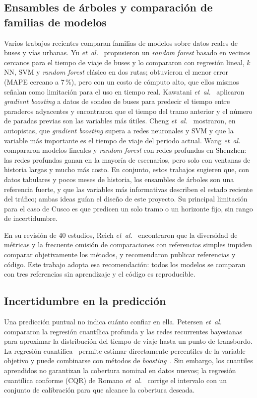 \documentclass[conference,a4paper]{IEEEtran}
\begin{document}
\subsection{Ensambles de árboles y comparación de familias de modelos}
Varios trabajos recientes comparan familias de modelos sobre datos reales de buses y vías urbanas. Yu \emph{et~al.}~\cite{yu2018} propusieron un \emph{random forest} basado en vecinos cercanos para el tiempo de viaje de buses y lo compararon con regresión lineal, $k$NN, SVM y \emph{random forest} clásico en dos rutas; obtuvieron el menor error (MAPE cercano a 7\,\%), pero con un costo de cómputo alto, que ellos mismos señalan como limitación para el uso en tiempo real. Kawatani \emph{et~al.}~\cite{kawatani2021} aplicaron \emph{gradient boosting} a datos de sondeo de buses para predecir el tiempo entre paraderos adyacentes y encontraron que el tiempo del tramo anterior y el número de paradas previas son las variables más útiles. Cheng \emph{et~al.}~\cite{cheng2019} mostraron, en autopistas, que \emph{gradient boosting} supera a redes neuronales y SVM y que la variable más importante es el tiempo de viaje del periodo actual. Wang \emph{et~al.}~\cite{wang2025} compararon modelos lineales y \emph{random forest} con redes profundas en Shenzhen: las redes profundas ganan en la mayoría de escenarios, pero solo con ventanas de historia largas y mucho más costo. En conjunto, estos trabajos sugieren que, con datos tabulares y pocos meses de historia, los ensambles de árboles son una referencia fuerte, y que las variables más informativas describen el estado reciente del tráfico; ambas ideas guían el diseño de este proyecto. Su principal limitación para el caso de Cusco es que predicen un solo tramo o un horizonte fijo, sin rango de incertidumbre.

En su revisión de 40 estudios, Reich \emph{et~al.}~\cite{reich2019} encontraron que la diversidad de métricas y la frecuente omisión de comparaciones con referencias simples impiden comparar objetivamente los métodos, y recomendaron publicar referencias y código. Este trabajo adopta esa recomendación: todos los modelos se comparan con tres referencias sin aprendizaje y el código es reproducible.

\subsection{Incertidumbre en la predicción}
Una predicción puntual no indica cuánto confiar en ella. Petersen \emph{et~al.}~\cite{petersen2021} compararon la regresión cuantílica profunda y las redes recurrentes bayesianas para aproximar la distribución del tiempo de viaje hasta un punto de transbordo. La regresión cuantílica~\cite{koenker1978} permite estimar directamente percentiles de la variable objetivo y puede combinarse con métodos de \emph{boosting}~\cite{friedman2001}. Sin embargo, los cuantiles aprendidos no garantizan la cobertura nominal en datos nuevos; la regresión cuantílica conforme (CQR) de Romano \emph{et~al.}~\cite{romano2019} corrige el intervalo con un conjunto de calibración para que alcance la cobertura deseada.
\end{document}
